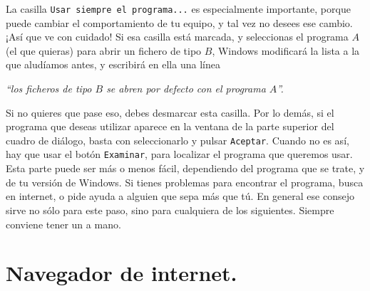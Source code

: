 \documentclass[10pt,a4paper]{article}\usepackage[]{graphicx}\usepackage[]{color}
\newcounter {cont01}
\begin{document}
La casilla {\tt Usar siempre el programa...} es especialmente importante, porque puede cambiar el
comportamiento de tu equipo, y tal vez no desees ese cambio. ¡Así que ve con cuidado! Si esa
casilla está marcada, y seleccionas el programa $A$ (el que quieras) para abrir un fichero de tipo
$B$, Windows modificará la lista a la que aludíamos antes, y escribirá en ella una línea
\begin{center}
{\em ``los ficheros de tipo $B$ se abren por defecto con el programa $A$''.}
\end{center}
Si no quieres que pase eso, debes desmarcar esta casilla. Por lo demás, si el programa que deseas
utilizar aparece en la ventana de la parte superior del cuadro de diálogo, basta con seleccionarlo
y pulsar {\tt Aceptar}. Cuando no es así, hay que usar el botón {\tt Examinar}, para localizar el
programa que queremos usar. Esta parte puede ser más o menos fácil, dependiendo del programa que se
trate, y de tu versión de Windows. Si tienes problemas para encontrar el programa, busca en
internet, o pide ayuda a alguien que sepa más que tú. En general ese consejo sirve no sólo para
este paso, sino para cualquiera de los siguientes. Siempre conviene tener un  a mano.

\section{Navegador de internet.}
\label{tut00:sec:NavegadorInternet}
\end{document}
